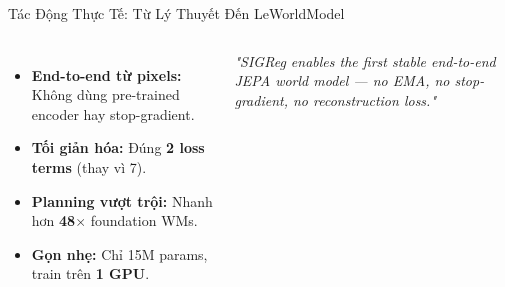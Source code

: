 \documentclass[aspectratio=169,9pt]{beamer}
\newcommand{\cmark}{\ding{51}}
\begin{document}
\begin{frame}{Tác Động Thực Tế: Từ Lý Thuyết Đến LeWorldModel}
\begin{columns}[c]
\vspace{0.3cm}
\begin{itemize}\small
  \setlength{\itemsep}{0.6em}
  \item[\textcolor{mgood}{\textbf{\cmark}}] \textbf{End-to-end từ pixels:} Không dùng pre-trained encoder hay stop-gradient.
  \item[\textcolor{mgood}{\textbf{\cmark}}] \textbf{Tối giản hóa:} Đúng \textbf{2 loss terms} (thay vì 7).
  \item[\textcolor{mgood}{\textbf{\cmark}}] \textbf{Planning vượt trội:} Nhanh hơn \textbf{48$\times$} foundation WMs.
  \item[\textcolor{mgood}{\textbf{\cmark}}] \textbf{Gọn nhẹ:} Chỉ 15M params, train trên \textbf{1 GPU}.
\end{itemize}

\vspace{0.5cm}
\begin{accentbox}
\centering\small\itshape
"SIGReg enables the first stable end-to-end JEPA world model — no EMA, no stop-gradient, no reconstruction loss."
\end{accentbox}

\end{columns}

\end{frame}
\end{document}
